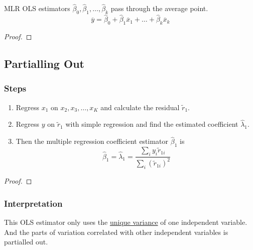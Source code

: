 \documentclass[]{article}
\begin{document}
    \begin{property}
        MLR OLS estimators $\hat{\beta}_0, \hat{\beta}_1, \dots, \hat{\beta}_k$ pass through the average point.
        \[
            \overline{y} = \hat{\beta}_0 + \hat{\beta}_1 \overline{x}_1 + \dots + \hat{\beta}_k \overline{x}_k
        \]
    \end{property}
    \begin{proof}
    \end{proof}
    
    \subsection{Partialling Out}
    \subsubsection{Steps}
        \begin{enumerate}
            \item Regress $x_1$ on $x_2, x_3, \dots, x_K$ and calculate the residual $\widetilde{r}_1$. 
            \item Regress $y$ on $\widetilde{r}_1$ with simple regression and find the estimated coefficient $\hat{\lambda}_1$.
            \item Then the multiple regression coefficient estimator $\hat{\beta}_1$ is
            \[
                \hat{\beta}_1 = \hat{\lambda}_1 = \frac{\sum_{i}{y_i \widetilde{r}_{1i}}}{\sum_i {(\widetilde{r}_{1i})^2}}
            \]
        \end{enumerate}
        \begin{proof}
        \end{proof}
        
    \subsubsection{Interpretation}
    \par This OLS estimator only uses the \ul{unique variance} of one independent variable. And the parts of variation correlated with other independent variables is partialled out.
    
\end{document}

